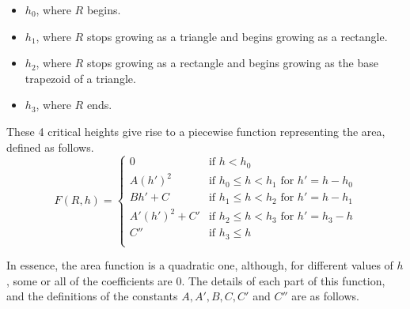 \begin{itemize}
\item $h_0$, where $R$ begins.
\item $h_1$, where $R$ stops growing as a triangle and begins growing as a rectangle.
\item $h_2$, where $R$ stops growing as a rectangle and begins growing as the base trapezoid of a triangle.
\item $h_3$, where $R$ ends.
\end{itemize}

These 4 critical heights give rise to a piecewise function representing the area, defined as follows.
\[
F(R, h) = \begin{cases}
0                  & \text{if }          h < h_0 \\
A(h')^2            & \text{if } h_0 \leq h < h_1 \text{ for } h' = h - h_0 \\
Bh' + C            & \text{if } h_1 \leq h < h_2 \text{ for } h' = h - h_1 \\
A'(h')^2 + C'      & \text{if } h_2 \leq h < h_3 \text{ for } h' = h_3 - h \\
C''                & \text{if } h_3 \leq h \\
\end{cases}
\]

In essence, the area function is a quadratic one, although, for different values of $h$, some or all of the coefficients are 0. The details of each part of this function, and the definitions of the constants $A, A', B, C, C'$ and $C''$ are as follows.

